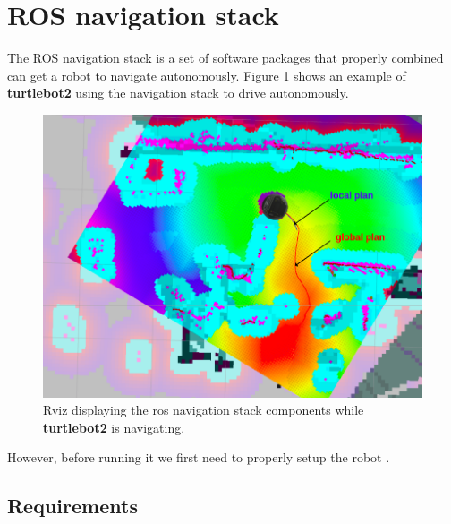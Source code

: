 \documentclass[12pt]{article}
\begin{document}
\section{ROS navigation stack}
The ROS navigation stack is a set of software packages that properly combined can get a robot to navigate autonomously.
Figure \ref{fig:plans} shows an example of \textbf{turtlebot2} using the navigation stack to drive autonomously.
\begin{figure}[!htb]
    \centering
    \includegraphics[width=\linewidth]{rviz_navigation2.png}
    \caption{Rviz displaying the ros navigation stack components while \textbf{turtlebot2} is navigating.}
    \label{fig:plans}
\end{figure}

However, before running it we first need to properly setup the robot \cite{stacksetup}.
\subsection{Requirements}
\end{document}

